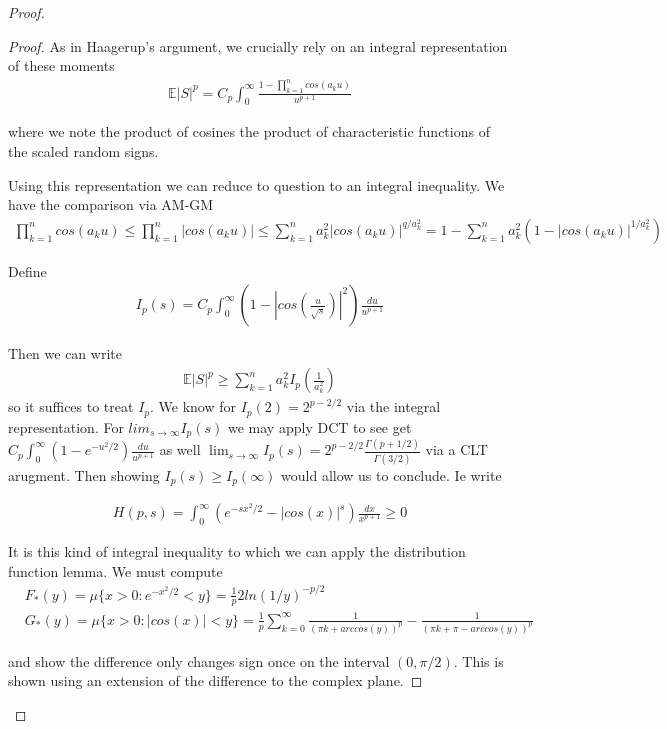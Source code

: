 \documentclass[10pt]{article}
\newcommand{\E}{\mathbb{E}}
\newcommand{\1}{\textbf{1}}
\theoremstyle{remark}
\theoremstyle{definition}
\begin{document}
\begin{proof}
\begin{proof}
	As in Haagerup's argument, we crucially rely on an integral representation of these moments
	\begin{align*}
		\E|S|^p = C_p\int_0^{\infty}\frac{1-\prod_{k=1}^n cos(a_k u)}{u^{p+1}}
	\end{align*}

	where we note the product of cosines the product of characteristic functions of the scaled random signs.

	Using this representation we can reduce to question to an integral inequality. We have the comparison via AM-GM
	\begin{align*}
		\prod_{k=1}^n cos(a_k u) \leq \prod_{k=1}^n |cos(a_k u)| \leq \sum_{k=1}^n a_k^2|cos(a_k u)|^{q/a_k^2} = 1 - \sum_{k=1}^na_k^2(1- |cos(a_k u)|^{1/a_k^2})
	\end{align*}

	Define 
	\begin{align*}
		I_p(s) = C_p\int_0^{\infty}(1-|cos(\frac{u}{\sqrt{s}})|^2)\frac{du}{u^{p+1}}
	\end{align*}

	Then we can write
	\begin{align*}
		\E|S|^p \geq \sum_{k=1}^na_k^2 I_p(\frac{1}{a_k^2})
	\end{align*}
	so it suffices to treat $I_p$. We know for $I_p(2) = 2^{p-2/2}$ via the integral representation. For $lim_{s \to \infty}I_p(s)$ we may apply DCT to see get $C_p \int_0^{\infty}(1-e^{-u^2/2})\frac{du}{u^{p+1}}$ as well $\lim_{s \to \infty}I_p(s) = 2^{p-2/2}\frac{\Gamma(p+1/2)}{\Gamma(3/2)}$ via a CLT arugment. Then showing $I_p(s) \geq I_p(\infty)$ would allow us to conclude. Ie write

	\begin{align*}
		H(p,s) = \int_0^{\infty}(e^{-sx^2/2} - |cos(x)|^s)\frac{dx}{x^{p+1}} \geq 0 
	\end{align*}

	It is this kind of integral inequality to which we can apply the distribution function lemma. We must compute
	\begin{align*}
		&F_*(y) = \mu\{x > 0 : e^{-x^2/2} < y\} = \frac{1}{p}2ln(1/y)^{-p/2}\\
		&G_*(y) = \mu\{x > 0: |cos(x)| < y\} = \frac{1}{p}\sum_{k=0}^{\infty}\frac{1}{(\pi k + arccos(y))^p} - \frac{1}{(\pi k + \pi - arccos(y))^p}
	\end{align*}

	and show the difference only changes sign once on the interval $(0,\pi/2)$. This is shown using an extension of the difference to the complex plane.


\end{proof}
\end{proof}
\end{document}
